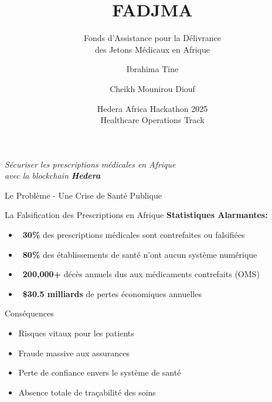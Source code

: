 \documentclass[aspectratio=169,11pt]{beamer}
\title{\textbf{FADJMA}}
\subtitle{Fonds d'Assistance pour la Délivrance \\des Jetons Médicaux en Afrique}
\author{Ibrahima Tine \and Cheikh Mounirou Diouf}
\institute{Zone01 Dakar - Sénégal \\ \textit{Hedera Certified Developers}}
\date{Hedera Africa Hackathon 2025 \\ Healthcare Operations Track}
\newcommand{\hedera}{\textbf{Hedera}\texttrademark}
\newcommand{\xmark}{\textcolor{alertRed}{\faTimesCircle}}
\begin{document}
\begin{frame}
\titlepage
\begin{center}
\large{\textit{Sécuriser les prescriptions médicales en Afrique \\avec la blockchain \hedera}}
\end{center}
\end{frame}

\begin{frame}{Le Problème - Une Crise de Santé Publique}

\begin{block}{La Falsification des Prescriptions en Afrique}
\textbf{Statistiques Alarmantes:}
\begin{itemize}
    \item \xmark~\textbf{30\%} des prescriptions médicales sont contrefaites ou falsifiées
    \item \xmark~\textbf{80\%} des établissements de santé n'ont aucun système numérique
    \item \xmark~\textbf{200,000+} décès annuels dus aux médicaments contrefaits (OMS)
    \item \xmark~\textbf{\$30.5 milliards} de pertes économiques annuelles
\end{itemize}
\end{block}

\vspace{0.3cm}

\begin{alertblock}{Conséquences}
\begin{itemize}
    \item Risques vitaux pour les patients
    \item Fraude massive aux assurances
    \item Perte de confiance envers le système de santé
    \item Absence totale de traçabilité des soins
\end{itemize}
\end{alertblock}

\end{frame}
\end{document}
